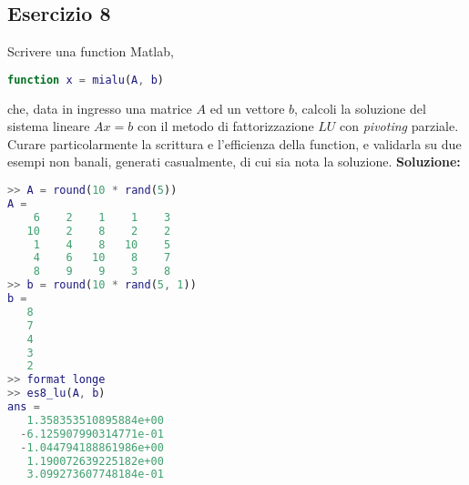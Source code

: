 \subsection{Esercizio 8}
Scrivere una function Matlab,
\begin{lstlisting}[language=Matlab]
function x = mialu(A, b)
\end{lstlisting}
che, data in ingresso una matrice $A$ ed un vettore $b$, calcoli la soluzione
del sistema lineare $Ax = b$ con il metodo di fattorizzazione $LU$ con \textit{pivoting} parziale.
Curare particolarmente la scrittura e l'efficienza della function,
e validarla su due esempi non banali, generati casualmente,
di cui sia nota la soluzione.
\newline \textbf{Soluzione:} \newline

\begin{lstlisting}[language=Matlab]
>> A = round(10 * rand(5))
A =
    6    2    1    1    3
   10    2    8    2    2
    1    4    8   10    5
    4    6   10    8    7
    8    9    9    3    8
>> b = round(10 * rand(5, 1))
b =
   8
   7
   4
   3
   2
>> format longe
>> es8_lu(A, b)
ans =
   1.358353510895884e+00
  -6.125907990314771e-01
  -1.044794188861986e+00
   1.190072639225182e+00
   3.099273607748184e-01
\end{lstlisting}
